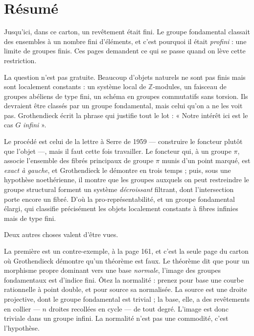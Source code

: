 \documentclass[11pt,a4paper]{article}
\begin{document}
\section*{Résumé}

\begin{resume}
Jusqu'ici, dans ce carton, un revêtement était fini. Le groupe fondamental
classait des ensembles à un nombre fini d'éléments, et c'est pourquoi il était
\emph{profini} : une limite de groupes finis. Ces pages demandent ce qui se
passe quand on lève cette restriction.

La question n'est pas gratuite. Beaucoup d'objets naturels ne sont pas finis
mais sont localement constants : un système local de $\mathbb{Z}$-modules, un
faisceau de groupes abéliens de type fini, un schéma en groupes commutatifs
sans torsion. Ils devraient être classés par un groupe fondamental, mais celui
qu'on a ne les voit pas. Grothendieck écrit la phrase qui justifie tout le
lot : « Notre intérêt ici est le cas $G$ \emph{infini} ».

Le procédé est celui de la lettre à Serre de 1959 --- construire le foncteur
plutôt que l'objet ---, mais il faut cette fois travailler. Le foncteur qui, à
un groupe $\pi$, associe l'ensemble des fibrés principaux de groupe $\pi$ munis
d'un point marqué, est \emph{exact à gauche}, et Grothendieck le démontre en
trois temps ; puis, sous une hypothèse noethérienne, il montre que les groupes
auxquels on peut restreindre le groupe structural forment un système
\emph{décroissant} filtrant, dont l'intersection porte encore un fibré. D'où la
pro-représentabilité, et un groupe fondamental élargi, qui classifie
précisément les objets localement constants à fibres infinies mais de type
fini.

Deux autres choses valent d'être vues.

La première est un contre-exemple, à la page 161, et c'est la seule page du
carton où Grothendieck démontre qu'un théorème est faux. Le théorème dit que
pour un morphisme propre dominant vers une base \emph{normale}, l'image des
groupes fondamentaux est d'indice fini. Ôtez la normalité : prenez pour base
une courbe rationnelle à point double, et pour source sa normalisée. La source
est une droite projective, dont le groupe fondamental est trivial ; la base,
elle, a des revêtements en collier --- $n$ droites recollées en cycle --- de
tout degré. L'image est donc triviale dans un groupe infini. La normalité n'est
pas une commodité, c'est l'hypothèse.


\end{resume}
\end{document}
